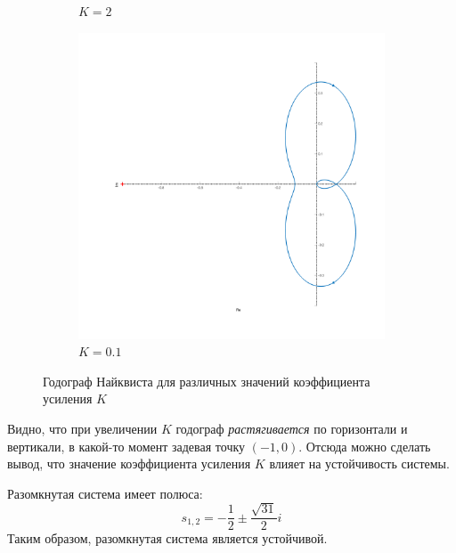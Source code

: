 \begin{figure}[ht!]
\begin{subfigure}{0.5\textwidth}
        \caption{$K = 2$}%
    \end{subfigure}
    \begin{subfigure}{0.5\textwidth}
        \centering
        \includegraphics[width=\textwidth]{media/plots/task4_nyquist_4.png}
        \caption{$K = 0.1$}
    \end{subfigure}
    \caption{Годограф Найквиста для различных значений коэффициента усиления $K$}
    \label{fig:task4_nyquist}
\end{figure}

Видно, что при увеличении $K$ годограф \textit{растягивается} по горизонтали и вертикали, в какой-то момент задевая точку $(-1, 0)$. 
Отсюда можно сделать вывод, что значение коэффициента усиления $K$ влияет на устойчивость системы.

Разомкнутая система имеет полюса: 
\begin{equation}
    s_{1,2} = -\frac{1}{2} \pm \frac{\sqrt{31}}{2}i
\end{equation}
Таким образом, разомкнутая система является устойчивой.

